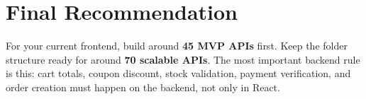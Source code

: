 \documentclass[11pt,a4paper]{article}
\begin{document}
\section{Final Recommendation}

For your current frontend, build around \textbf{45 MVP APIs} first. Keep the folder structure ready for around \textbf{70 scalable APIs}. The most important backend rule is this: cart totals, coupon discount, stock validation, payment verification, and order creation must happen on the backend, not only in React.
\end{document}

